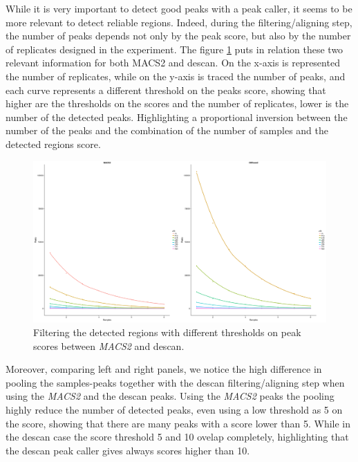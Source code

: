 While it is very important to detect good peaks with a peak caller, it seems to be more relevant to detect reliable regions. Indeed, during the filtering/aligning step, the number of peaks depends not only by the peak score, but also by the number of replicates designed in the experiment.
The figure \ref{fig:filteringdescanmacs2} puts in relation these two relevant information for both MACS2 and \gls{descan}. 
On the x-axis is represented the number of replicates, while on the y-axis is traced the number of peaks, and each curve represents a different threshold on the peaks score, showing that higher are the thresholds on the scores and the number of replicates, lower is the number of the detected peaks.
Highlighting a proportional inversion between the number of the peaks and the combination of the number of samples and the detected regions score.

\begin{figure}[H]
\includegraphics[width=\textwidth, height=\textheight, keepaspectratio]{img/descan2/filtering_m2_d2.png}
\caption[\gls{descan} and \textit{MACS2} filtering comparison]{Filtering the detected regions with different thresholds on peak scores between \textit{MACS2} and \gls{descan}.}
\label{fig:filteringdescanmacs2}
\centering
\end{figure}


Moreover, comparing left and right panels, we notice the high difference in pooling the samples-peaks together with the \gls{descan} filtering/aligning step when using the \textit{MACS2} and the \gls{descan} peaks.
Using the \textit{MACS2} peaks the pooling highly reduce the number of detected peaks, even using a low threshold as 5 on the score, showing that there are many peaks with a score lower than 5.
While in the \gls{descan} case the score threshold 5 and 10 ovelap completely, highlighting that the \gls{descan} peak caller gives always scores higher than 10.

